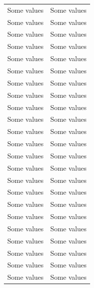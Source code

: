 \documentclass[11pt,a4paper]{article}
\begin{document}
\begin{minipage}{0.45\textwidth}
\begin{tabular}{cc}
        Some values & Some values \\
        Some values & Some values \\
        Some values & Some values \\
        Some values & Some values \\
        Some values & Some values \\
        Some values & Some values \\
        Some values & Some values \\
        Some values & Some values \\
        Some values & Some values \\
        Some values & Some values \\
        Some values & Some values \\
        Some values & Some values \\
        Some values & Some values \\
        Some values & Some values \\
        Some values & Some values \\
        Some values & Some values \\
        Some values & Some values \\
        Some values & Some values \\
        Some values & Some values \\
        Some values & Some values \\
        Some values & Some values \\
        Some values & Some values \\
        Some values & Some values \\ \hline
      \end{tabular}
\end{minipage}
\end{document}
